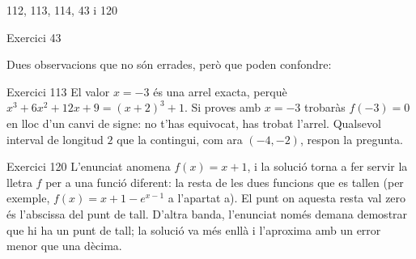 
%
        {112, 113, 114, 43 i 120}

\begin{errada}{Exercici 43}
\end{errada}


\ifobs
\bigskip
\noindent
Dues observacions que no són errades, però que poden confondre:

\begin{observacio}{Exercici 113}
  El valor $x=-3$ és una arrel exacta, perquè
  $x^3+6x^2+12x+9=(x+2)^3+1$. Si proves amb $x=-3$ trobaràs $f(-3)=0$ en lloc
  d'un canvi de signe: no t'has equivocat, has trobat l'arrel. Qualsevol
  interval de longitud $2$ que la contingui, com ara $(-4,-2)$, respon la
  pregunta.
\end{observacio}

\begin{observacio}{Exercici 120}
  L'enunciat anomena $f(x)=x+1$, i la solució torna a fer servir la lletra $f$
  per a una funció diferent: la resta de les dues funcions que es tallen (per
  exemple, $f(x)=x+1-e^{x-1}$ a l'apartat a). El punt on aquesta resta val
  zero és l'abscissa del punt de tall. D'altra banda, l'enunciat només demana
  demostrar que hi ha un punt de tall; la solució va més enllà i l'aproxima
  amb un error menor que una dècima.
\end{observacio}
\fi
